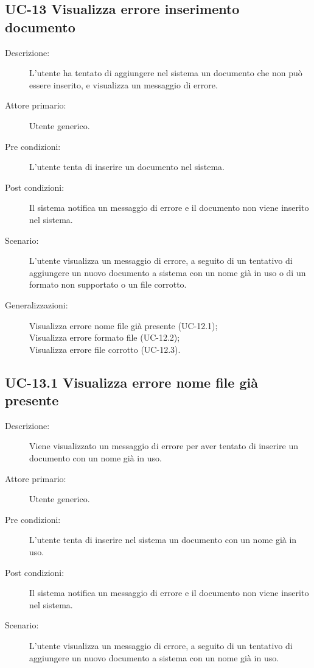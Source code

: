 \subsection{UC-13 Visualizza errore inserimento documento}
\begin{description}
    \item[Descrizione:] L'utente ha tentato di aggiungere nel sistema un documento che non può essere inserito, e visualizza un messaggio di errore.
    \item[Attore primario:] Utente generico.
    \item[Pre condizioni:] L'utente tenta di inserire un documento nel sistema.
    \item[Post condizioni:] Il sistema notifica un messaggio di errore e il documento non viene inserito nel sistema.
    \item[Scenario:] L'utente visualizza un messaggio di errore, a seguito di un tentativo di aggiungere un nuovo documento a sistema con un nome già in uso o di un formato non supportato o un file corrotto.
    \item[Generalizzazioni:] Visualizza errore nome file già presente (UC-12.1);\\Visualizza errore formato file (UC-12.2);\\Visualizza errore file corrotto (UC-12.3).
\end{description}

\subsection{UC-13.1 Visualizza errore nome file già presente}
\begin{description}
    \item[Descrizione:] Viene visualizzato un messaggio di errore per aver tentato di inserire un documento con un nome già in uso.
    \item[Attore primario:] Utente generico.
    \item[Pre condizioni:] L'utente tenta di inserire nel sistema un documento con un nome già in uso.
    \item[Post condizioni:] Il sistema notifica un messaggio di errore e il documento non viene inserito nel sistema.
    \item[Scenario:] L'utente visualizza un messaggio di errore, a seguito di un tentativo di aggiungere un nuovo documento a sistema con un nome già in uso.
\end{description}

